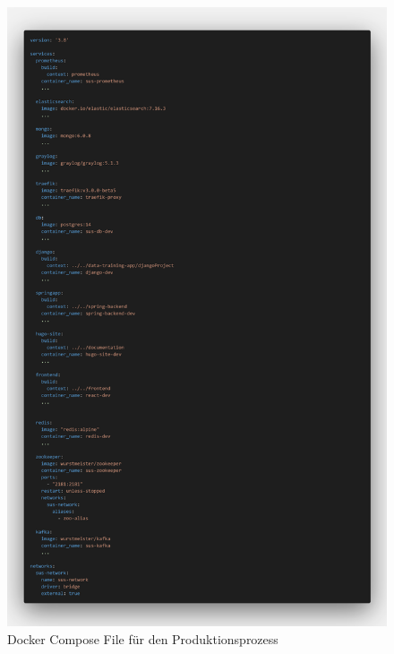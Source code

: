 \begin{figure}[ht]
    \centering
    \begin{minipage}{0.5\textwidth}
        \centering
        \includegraphics[width=\textwidth,height=\textheight,keepaspectratio]{includes/figures/code/code.png}
        \caption{Docker Compose File für den Produktionsprozess}
        \label{fig:code}
    \end{minipage}\hfill
    \begin{minipage}{0.5\textwidth}
        \centering

\end{minipage}
\end{figure}
